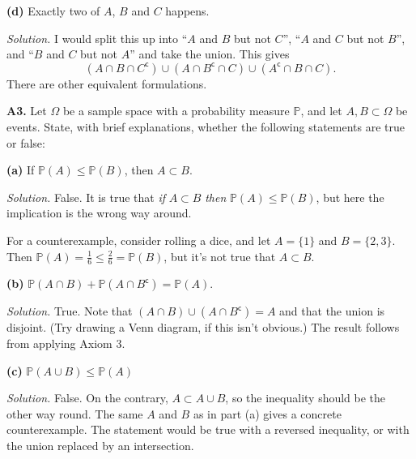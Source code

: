 \documentclass[
  a4paper,
]{book}
\theoremstyle{definition}
\theoremstyle{definition}
\theoremstyle{definition}
\theoremstyle{definition}
\theoremstyle{remark}
\begin{document}
\textbf{(d)} Exactly two of \(A\), \(B\) and \(C\) happens.

\begin{myanswers}
\emph{Solution.} I would split this up into ``\(A\) and \(B\) but not \(C\)'', ``\(A\) and \(C\) but not \(B\)'', and ``\(B\) and \(C\) but not \(A\)'' and take the union. This gives
\[  (A \cap B \cap C^{\mathsf{c}}) \cup (A \cap B^{\mathsf{c}} \cap C) \cup (A^{\mathsf{c}} \cap B \cap C) . \]
There are other equivalent formulations.

\end{myanswers}

\textbf{A3.} Let \(\Omega\) be a sample space with a probability measure \(\mathbb P\), and let \(A, B \subset \Omega\) be events. State, with brief explanations, whether the following statements are true or false:

\textbf{(a)} If \(\mathbb P(A) \leq \mathbb P(B)\), then \(A \subset B\).

\begin{myanswers}
\emph{Solution.} False. It is true that \emph{if} \(A \subset B\) \emph{then} \(\mathbb P(A) \leq \mathbb P(B)\), but here the implication is the wrong way around.

For a counterexample, consider rolling a dice, and let \(A = \{1\}\) and \(B = \{2,3\}\). Then \(\mathbb P(A) = \frac16 \leq \frac26 = \mathbb P(B)\), but it's not true that \(A \subset B\).

\end{myanswers}

\textbf{(b)} \(\mathbb P(A \cap B) + \mathbb P(A \cap B^{\mathsf{c}}) = \mathbb P(A)\).

\begin{myanswers}
\emph{Solution.} True. Note that \((A \cap B) \cup (A \cap B^{\mathsf{c}}) = A\) and that the union is disjoint. (Try drawing a Venn diagram, if this isn't obvious.) The result follows from applying Axiom 3.

\end{myanswers}

\textbf{(c)} \(\mathbb P(A \cup B) \leq \mathbb P(A)\)

\begin{myanswers}
\emph{Solution.} False. On the contrary, \(A \subset A \cup B\), so the inequality should be the other way round. The same \(A\) and \(B\) as in part (a) gives a concrete counterexample. The statement would be true with a reversed inequality, or with the union replaced by an intersection.

\end{myanswers}
\end{document}
